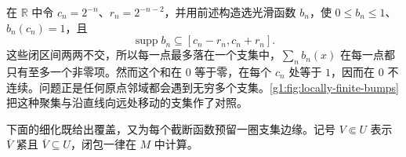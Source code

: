 \begin{example}\label{g1:exm:pointwise-finite-smooth-sum}
	在 \(\mathbb R\) 中令 \(c_n=2^{-n}\)、\(r_n=2^{-n-2}\)，并用前述构造选光滑函数 \(b_n\)，使 \(0\le b_n\le1\)、\(b_n(c_n)=1\)，且
	\[
		\operatorname{supp}b_n\subseteq[c_n-r_n,c_n+r_n].
	\]
	这些闭区间两两不交，所以每一点最多落在一个支集中，\(\sum_n b_n(x)\) 在每一点都只有至多一个非零项。然而这个和在 \(0\) 等于零，在每个 \(c_n\) 处等于 \(1\)，因而在 \(0\) 不连续。问题正是任何原点邻域都会遇到无穷多个支集。\cref{g1:fig:locally-finite-bumps}把这种聚集与沿直线向远处移动的支集作了对照。
\end{example}



下面的细化既给出覆盖，又为每个截断函数预留一圈支集边缘。记号 \(V\Subset U\) 表示 \(\overline V\) 紧且 \(\overline V\subseteq U\)，闭包一律在 \(M\) 中计算。

